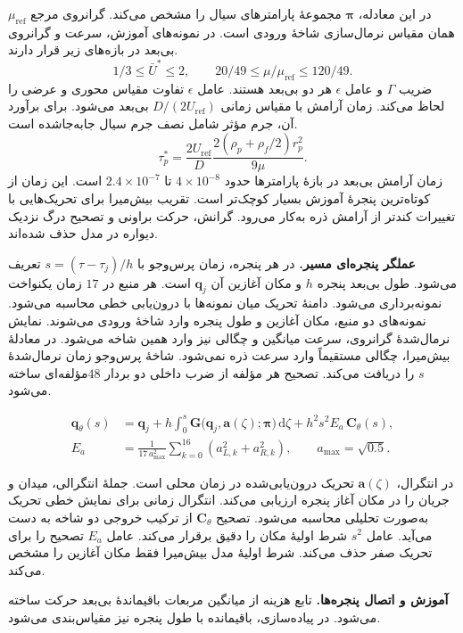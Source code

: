 در این معادله، $\boldsymbol\pi$ مجموعهٔ پارامترهای سیال را مشخص می‌کند.
گرانروی مرجع $\mu_{\mathrm{ref}}$ همان مقیاس نرمال‌سازی شاخهٔ ورودی است.
در نمونه‌های آموزش، سرعت و گرانروی بی‌بعد در بازه‌های زیر قرار دارند.
\[
1/3\le\bar U^*\le2,\qquad
20/49\le \mu/\mu_{\mathrm{ref}}\le120/49.
\]
ضریب $\Gamma$ و عامل $\epsilon$ هر دو بی‌بعد هستند.
عامل $\epsilon$ تفاوت مقیاس محوری و عرضی را لحاظ می‌کند.
زمان آرامش با مقیاس زمانی $D/(2U_{\mathrm{ref}})$ بی‌بعد می‌شود.
برای برآورد آن، جرم مؤثر شامل نصف جرم سیال جابه‌جاشده است.
\[
\tau_p^*=
\frac{2U_{\mathrm{ref}}}{D}
\frac{2(\rho_p+\rho_f/2)r_p^2}{9\mu}.
\]
زمان آرامش بی‌بعد در بازهٔ پارامترها حدود $4\times10^{-8}$ تا $2.4\times10^{-7}$ است.
این زمان از کوتاه‌ترین پنجرهٔ آموزش بسیار کوچک‌تر است.
تقریب بیش‌میرا برای تحریک‌هایی با تغییرات کندتر از آرامش ذره به‌کار می‌رود.
گرانش، حرکت براونی و تصحیح درگ نزدیک دیواره در مدل حذف شده‌اند.

\textbf{عملگر پنجره‌ای مسیر.}
در هر پنجره، زمان پرس‌وجو با $s=(\tau-\tau_j)/h$ تعریف می‌شود.
طول بی‌بعد پنجره $h$ و مکان آغازین آن $\mathbf q_j$ است.
هر منبع در $17$ زمان یکنواخت نمونه‌برداری می‌شود.
دامنهٔ تحریک میان نمونه‌ها با درون‌یابی خطی محاسبه می‌شود.
نمونه‌های دو منبع، مکان آغازین و طول پنجره وارد شاخهٔ ورودی می‌شوند.
نمایش نرمال‌شدهٔ گرانروی، سرعت میانگین و چگالی نیز وارد همین شاخه می‌شود.
در معادلهٔ بیش‌میرا، چگالی مستقیماً وارد سرعت ذره نمی‌شود.
شاخهٔ پرس‌وجو زمان نرمال‌شدهٔ $s$ را دریافت می‌کند.
تصحیح هر مؤلفه از ضرب داخلی دو بردار $48$مؤلفه‌ای ساخته می‌شود.

\begin{equation}
\begin{aligned}
\mathbf q_\theta(s)&=
\mathbf q_j+
h\int_0^s \mathbf G\big(\mathbf q_j,\mathbf a(\zeta);\boldsymbol\pi\big)\,\mathrm d\zeta
+h^2s^2E_a\,\mathbf C_\theta(s),\\
E_a&=\frac{1}{17\,a_{\max}^2}
\sum_{k=0}^{16}(a_{L,k}^2+a_{R,k}^2),
\qquad a_{\max}=\sqrt{0.5}.
\end{aligned}
\label{eq:forward-mag-window}
\end{equation}

در انتگرال، $\mathbf a(\zeta)$ تحریک درون‌یابی‌شده در زمان محلی است.
جملهٔ انتگرالی، میدان و جریان را در مکان آغاز پنجره ارزیابی می‌کند.
انتگرال زمانی برای نمایش خطی تحریک به‌صورت تحلیلی محاسبه می‌شود.
تصحیح $\mathbf C_\theta$ از ترکیب خروجی دو شاخه به دست می‌آید.
عامل $s^2$ شرط اولیهٔ مکان را دقیق برقرار می‌کند.
عامل $E_a$ تصحیح را برای تحریک صفر حذف می‌کند.
شرط اولیهٔ مدل بیش‌میرا فقط مکان آغازین را مشخص می‌کند.

\textbf{آموزش و اتصال پنجره‌ها.}
تابع هزینه از میانگین مربعات باقیماندهٔ بی‌بعد حرکت ساخته می‌شود.
در پیاده‌سازی، باقیمانده با طول پنجره نیز مقیاس‌بندی می‌شود.

